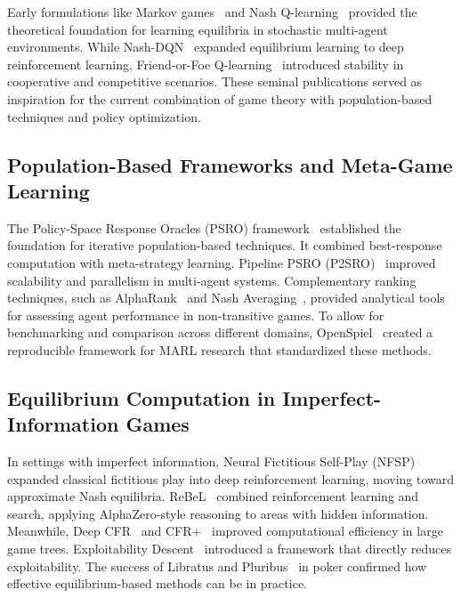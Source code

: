 \documentclass[sigconf,anonymous]{aamas}
\begin{document}
Early formulations like Markov games~\cite{Littman1994} and Nash Q-learning~\cite{Hu2003} provided the theoretical foundation for learning equilibria in stochastic multi-agent environments. While Nash-DQN~\cite{Casgrain2019} expanded equilibrium learning to deep reinforcement learning, Friend-or-Foe Q-learning~\cite{Littman2001} introduced stability in cooperative and competitive scenarios. These seminal publications served as inspiration for the current combination of game theory with population-based techniques and policy optimization.

\subsection{Population-Based Frameworks and Meta-Game Learning}

The Policy-Space Response Oracles (PSRO) framework~\cite{Lanctot2017} established the foundation for iterative population-based techniques. It combined best-response computation with meta-strategy learning. Pipeline PSRO (P2SRO)~\cite{McAleer2020} improved scalability and parallelism in multi-agent systems. Complementary ranking techniques, such as AlphaRank~\cite{Omidshafiei2019} and Nash Averaging~\cite{Balduzzi2018}, provided analytical tools for assessing agent performance in non-transitive games. To allow for benchmarking and comparison across different domains, OpenSpiel~\cite{Lanctot2019OpenSpielOS} created a reproducible framework for MARL research that standardized these methods.

\subsection{Equilibrium Computation in Imperfect-Information Games}

In settings with imperfect information, Neural Fictitious Self-Play (NFSP)~\cite{Heinrich2016} expanded classical fictitious play into deep reinforcement learning, moving toward approximate Nash equilibria. ReBeL~\cite{Brown2020} combined reinforcement learning and search, applying AlphaZero-style reasoning to areas with hidden information. Meanwhile, Deep CFR~\cite{Brown2018DeepCF} and CFR+~\cite{Tammelin2014} improved computational efficiency in large game trees. Exploitability Descent~\cite{Lockhart2019} introduced a framework that directly reduces exploitability. The success of Libratus and Pluribus~\cite{Brown2018Science,Brown2019Science} in poker confirmed how effective equilibrium-based methods can be in practice.
\end{document}

